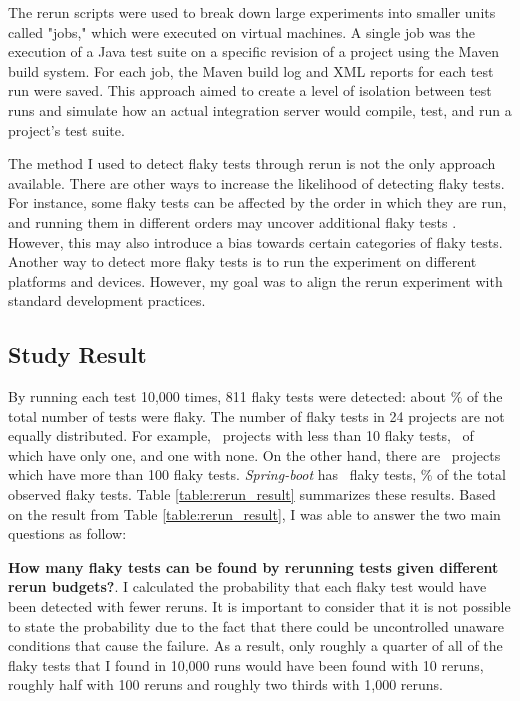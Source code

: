 The rerun scripts were used to break down large experiments into smaller units called "jobs," which were executed on virtual machines. A single job was the execution of a Java test suite on a specific revision of a project using the Maven build system. For each job, the Maven build log and XML reports for each test run were saved. This approach aimed to create a level of isolation between test runs and simulate how an actual integration server would compile, test, and run a project's test suite.


The method I used to detect flaky tests through rerun is not the only approach available. There are other ways to increase the likelihood of detecting flaky tests. For instance, some flaky tests can be affected by the order in which they are run, and running them in different orders may uncover additional flaky tests \cite{lam2019idflakies}. However, this may also introduce a bias towards certain categories of flaky tests. Another way to detect more flaky tests is to run the experiment on different platforms and devices. However, my goal was to align the rerun experiment with standard development practices.


\subsection{Study Result}

By running each test 10,000 times, 811 flaky tests were detected: about \flakytestsrate\% of the total number of tests were flaky. The number of flaky tests in 24 projects are not equally distributed. For example, \projectsout~projects with less than 10 flaky tests, \projectsoneflaky~of which have only one, and one with none. On the other hand, there are \projectshundredsflaky~projects which have more than 100 flaky tests. \emph{Spring-boot} has \springbootFlaky~flaky tests, \highestflakyrate\% of the total observed flaky tests. Table \ref{table:rerun_result} summarizes these results. Based on the result from Table \ref{table:rerun_result}, I was able to answer the two main questions as follow:

\textbf{How many flaky tests can be found by rerunning tests given different rerun budgets?}. I calculated the probability that each flaky test would have been detected with fewer reruns. It is important to consider that it is not possible to state the probability due to the fact that there could be uncontrolled unaware conditions that cause the failure. As a result, only roughly a quarter of all of the flaky tests that I found in 10,000 runs would have been found with 10 reruns, roughly half with 100 reruns and roughly two thirds with 1,000 reruns.

